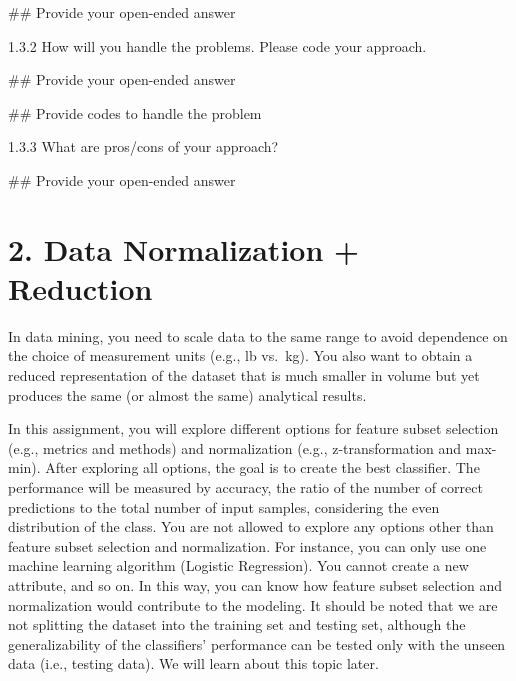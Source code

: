 \documentclass[
  letterpaper,
]{scrbook}
\newenvironment{Shaded}{\begin{snugshade}}{\end{snugshade}}
\newcommand{\CommentTok}[1]{\textcolor[rgb]{0.37,0.37,0.37}{#1}}
\begin{document}
\begin{Shaded}
\begin{Highlighting}[]
\CommentTok{\#\# Provide your open{-}ended answer}
\end{Highlighting}
\end{Shaded}

1.3.2 How will you handle the problems. Please code your approach.

\begin{Shaded}
\begin{Highlighting}[]
\CommentTok{\#\# Provide your open{-}ended answer}
\end{Highlighting}
\end{Shaded}

\begin{Shaded}
\begin{Highlighting}[]
\CommentTok{\#\# Provide codes to handle the problem}
\end{Highlighting}
\end{Shaded}

1.3.3 What are pros/cons of your approach?

\begin{Shaded}
\begin{Highlighting}[]
\CommentTok{\#\# Provide your open{-}ended answer}
\end{Highlighting}
\end{Shaded}

\section*{2. Data Normalization +
Reduction}\label{data-normalization-reduction}


In data mining, you need to scale data to the same range to avoid
dependence on the choice of measurement units (e.g., lb vs.~kg). You
also want to obtain a reduced representation of the dataset that is much
smaller in volume but yet produces the same (or almost the same)
analytical results.

In this assignment, you will explore different options for feature
subset selection (e.g., metrics and methods) and normalization (e.g.,
z-transformation and max-min). After exploring all options, the goal is
to create the best classifier. The performance will be measured by
accuracy, the ratio of the number of correct predictions to the total
number of input samples, considering the even distribution of the class.
You are not allowed to explore any options other than feature subset
selection and normalization. For instance, you can only use one machine
learning algorithm (Logistic Regression). You cannot create a new
attribute, and so on. In this way, you can know how feature subset
selection and normalization would contribute to the modeling. It should
be noted that we are not splitting the dataset into the training set and
testing set, although the generalizability of the classifiers'
performance can be tested only with the unseen data (i.e., testing
data). We will learn about this topic later.
\end{document}
